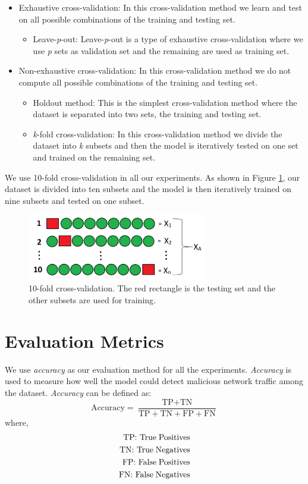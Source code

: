 \begin{itemize}
	\item Exhaustive cross-validation:
	In this cross-validation method we learn and test on all possible combinations of the training and testing set.
	\begin{itemize}
		\item Leave-\emph{p}-out:
		Leave-\emph{p}-out is a type of exhaustive cross-validation where we use \emph{p} sets as validation set and the remaining are used as training set.
	\end{itemize}
	\item Non-exhaustive cross-validation:
	In this cross-validation method we do not compute all possible combinations of the training and testing set.
	\begin{itemize}
		\item Holdout method:
		This is the simplest cross-validation method where the dataset is separated into two sets, the training and testing set.
		\item \emph{k}-fold cross-validation:
		In this cross-validation method we divide the dataset into \emph{k} subsets and then the model is iteratively tested on one set and trained on the remaining set.
	\end{itemize}
\end{itemize}

We use 10-fold cross-validation in all our experiments. As shown in Figure \ref{fig:10-fold}, our dataset is divided into ten subsets and the model is then iteratively trained on nine subsets and tested on one subset.

\begin{figure}[htb]
	\centering
	\includegraphics[width=0.7\textwidth]{images/k-fold.png}
	\caption{10-fold cross-validation. The red rectangle is the testing set and the other subsets are used for training.} 
	\label{fig:10-fold}
\end{figure}

\section{Evaluation Metrics}

We use \emph{accuracy} as our evaluation method for all the experiments. \emph{Accuracy} is used to measure how well the model could detect malicious network traffic among the dataset. \emph{Accuracy} can be defined as:
$$
\mbox{Accuracy} = \dfrac{\mbox{TP} + \mbox{TN}}{\mbox{TP} + \mbox{TN} + \mbox{FP} + \mbox{FN}}
$$
where,
\begin{align*}
\mbox{TP: True\;Positives} \\
\mbox{TN: True\;Negatives}\\
\mbox{FP: False\;Positives}\\
\mbox{FN: False\;Negatives}\\
\end{align*}
